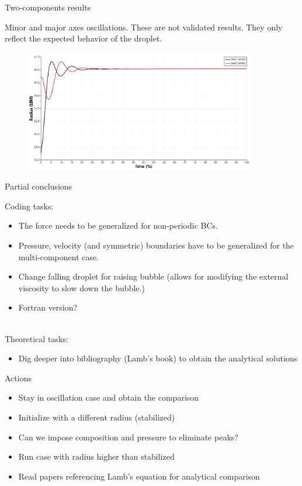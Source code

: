 \documentclass[8pt]{beamer}
\begin{document}
	\begin{frame}{Two-components results}
		
		Minor and major axes oscillations. These are not validated results. They only reflect the expected behavior of the droplet.
		\begin{figure}
			\centering
			\includegraphics[width=0.9\textwidth]{pics/TwoCMP_MRT_OscRadius.png}
		\end{figure}
	\end{frame}

	\begin{frame}{Partial conclusions}
		
		Coding tasks:
		\begin{itemize}
			\item The force needs to be generalized for non-periodic BCs. 
			\item Pressure, velocity (and symmetric) boundaries have to be generalized for the multi-component case.
			\item Change falling droplet for raising bubble (allows for modifying the external viscosity to slow down the bubble.)
			\item Fortran version?
		\end{itemize}
	
		~\\Theoretical tasks:
		\begin{itemize}
			\item Dig deeper into bibliography (Lamb's book) to obtain the analytical solutions
			
		\end{itemize}
	\end{frame}
	
	\begin{frame}{Actions}
	\begin{itemize}
		\item Stay in oscillation case and obtain the comparison
		\item Initialize with a different radius (stabilized)
		\item Can we impose composition and pressure to eliminate peaks?
		\item Run case with radius higher than stabilized
		
		\item Read papers referencing Lamb's equation for analytical comparison
	\end{itemize}
	\end{frame}
\end{document}
